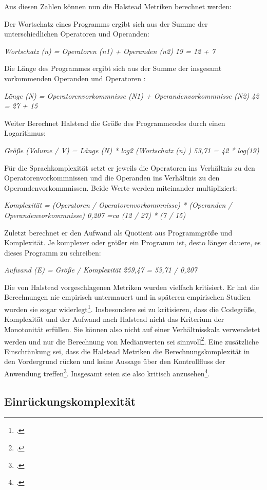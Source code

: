 Aus diesen Zahlen können nun die Halstead Metriken berechnet werden:

Der Wortschatz eines Programms ergibt sich aus der Summe der
unterschiedlichen Operatoren und Operanden:

\emph{Wortschatz (n) = Operatoren (n1) + Operanden (n2) 19 = 12 + 7}

Die Länge des Programmes ergibt sich aus der Summe der insgesamt
vorkommenden Operanden und Operatoren :

\emph{Länge (N) = Operatorenvorkommnisse (N1) + Operandenvorkommnisse
(N2) 42 = 27 + 15}

Weiter Berechnet Halstead die Größe des Programmcodes durch einen
Logarithmus:

\emph{Größe (Volume / V) = Länge (N) * log2 (Wortschatz (n) ) 53,71 = 42
* log(19)}

Für die Sprachkomplexität setzt er jeweils die Operatoren ins Verhältnis
zu den Operatorenvorkommnissen und die Operanden ins Verhältnis zu den
Operandenvorkommnissen. Beide Werte werden miteinander multipliziert:

\emph{Komplexität = (Operatoren / Operatorenvorkommnisse) * (Operanden /
Operandenvorkommnisse) 0,207 =ca (12 / 27) * (7 / 15)}

Zuletzt berechnet er den Aufwand als Quotient aus Programmgröße und
Komplexität. Je komplexer oder größer ein Programm ist, desto länger
dauere, es dieses Programm zu schreiben:

\emph{Aufwand (E) = Größe / Komplexität 259,47 = 53,71 / 0,207}

Die von Halstead vorgeschlagenen Metriken wurden vielfach kritisiert. Er
hat die Berechnungen nie empirisch untermauert und in späteren
empirischen Studien wurden sie sogar widerlegt\footcite[Vgl. ][S. 185]{sneedSoftwareZahlenVermessung2010}. Insbesondere sei zu kritisieren, dass die Codegröße,
Komplexität und der Aufwand nach Halstead nicht das Kriterium der
Monotonität erfüllen. Sie können also nicht auf einer Verhältnisskala
verwendetet werden und nur die Berechnung von Medianwerten sei
sinnvoll\footcite[Vgl. ][S. 142]{zuseSoftwareComplexityMeasures1991}. Eine zusätzliche Einschränkung
sei, dass die Halstead Metriken die Berechnungskomplexität in den
Vordergrund rücken und keine Aussage über den Kontrollfluss der
Anwendung treffen\footcite[Vgl. ][S. 2]{rumreichExaminingSoftwareDesign2019}. Insgesamt seien sie also kritisch anzusehen\footcite[Vgl. ][S. 185]{sneedSoftwareZahlenVermessung2010}.


\subsection{Einrückungskomplexität}\label{Einruckungskomplexitat}

